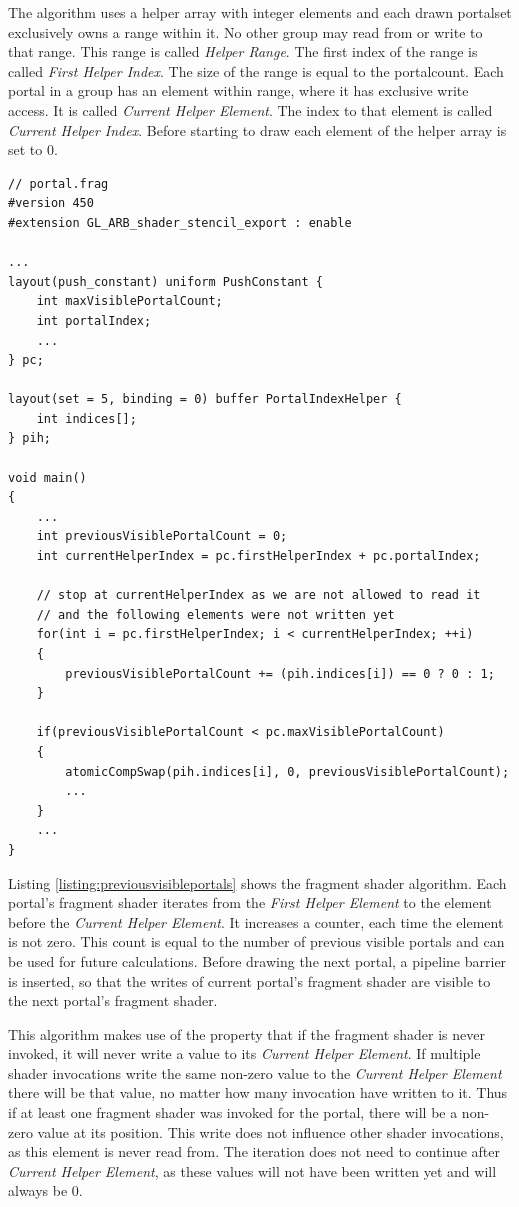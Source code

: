 The algorithm uses a helper array with integer elements and each drawn \gls{portalset} exclusively owns a range within it. No other group may read from or write to that range. This range is called \textit{Helper Range}. The first index of the range is called \textit{First Helper Index}. The size of the range is equal to the \gls{portalcount}. Each portal in a group has an element within range, where it has exclusive write access. It is called \textit{Current Helper Element}. The index to that element is called \textit{Current Helper Index}. Before starting to draw each element of the helper array is set to 0.

\begin{lstlisting}[caption={Calculate Previous Visible Portals}, label=listing:previousvisibleportals]
// portal.frag
#version 450
#extension GL_ARB_shader_stencil_export : enable

...
layout(push_constant) uniform PushConstant {	
	int maxVisiblePortalCount;
	int portalIndex;
	...
} pc;

layout(set = 5, binding = 0) buffer PortalIndexHelper {
	int indices[];
} pih;

void main()
{
	...
	int previousVisiblePortalCount = 0;
	int currentHelperIndex = pc.firstHelperIndex + pc.portalIndex;
	
	// stop at currentHelperIndex as we are not allowed to read it
	// and the following elements were not written yet
	for(int i = pc.firstHelperIndex; i < currentHelperIndex; ++i)
	{
		previousVisiblePortalCount += (pih.indices[i]) == 0 ? 0 : 1;
	}
	
	if(previousVisiblePortalCount < pc.maxVisiblePortalCount)
	{
		atomicCompSwap(pih.indices[i], 0, previousVisiblePortalCount);
		...
	}
	...
}
\end{lstlisting}

Listing \ref{listing:previousvisibleportals} shows the fragment shader algorithm. Each portal's fragment shader iterates from the \textit{First Helper Element} to the element before the \textit{Current Helper Element}. It increases a counter, each time the element is not zero. This count is equal to the number of previous visible portals and can be used for future calculations. Before drawing the next portal, a pipeline barrier is inserted, so that the writes of current portal's fragment shader are visible to the next portal's fragment shader.

This algorithm makes use of the property that if the fragment shader is never invoked, it will never write a value to its \textit{Current Helper Element}. If multiple shader invocations write the same non-zero value to the \textit{Current Helper Element} there will be that value, no matter how many invocation have written to it.
Thus if at least one fragment shader was invoked for the portal, there will be a non-zero value at its position. This write does not influence other shader invocations, as this element is never read from. The iteration does not need to continue after \textit{Current Helper Element}, as these values will not have been written yet and will always be 0.

